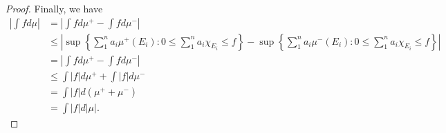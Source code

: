 \documentclass[10pt]{article}
\newcommand{\Int}{{\displaystyle \int}}
\begin{document}
\begin{enumerate}
\begin{proof}
Finally, we have
\begin{align*}
\left| \Int f d\mu \right| &=
\left|\Int f d\mu^+ - \Int f d\mu^- \right|
\\
&\leq \left| \sup\left\{ \sum_1^n a_i \mu^+(E_i) : 0 \leq \sum_1^n a_i \chi_{E_i} \leq f \right\} - \sup\left\{\sum_1^n a_i \mu^-(E_i) : 0 \leq \sum_1^n a_i \chi_{E_i} \leq f \right\} \right|
\\
&= \left| \Int f d\mu^+ - \Int f d\mu^- \right|
\\
&\leq \Int |f| d\mu^+ + \Int |f| d\mu^-
\\
&= \Int |f| d(\mu^+ + \mu^-)
\\
&= \Int |f| d|\mu|.
\end{align*}






\begin{comment}
\begin{align*}
\left| \Int f d\mu \right| &= \left| \sup\left\{ \sum_1^n a_i \mu(E_i) : 0 \leq \sum_1^n a_i \chi_{E_i} \leq f \right\} \right|
\\
&= \left| \sup\left\{ \sum_1^n a_i \mu^+(E_i) - \sum_1^n a_i \mu^-(E_i) : 0 \leq \sum_1^n a_i \chi_{E_i} \leq f \right\} \right|
\\
&\leq \left| \sup\left\{ \left|\sum_1^n a_i \mu^+(E_i)\right| + \left|\sum_1^n a_i \mu^-(E_i)\right| : 0 \leq \sum_1^n a_i \chi_{E_i} \leq f \right\} \right|
\\
&\leq \left| \sup\left\{ \left|\sum_1^n a_i \mu^+(E_i)\right| : 0 \leq \sum_1^n a_i \chi_{E_i} \leq f \right\} + \sup\left\{\left|\sum_1^n a_i \mu^-(E_i)\right| : 0 \leq \sum_1^n a_i \chi_{E_i} \leq f \right\} \right|
\\
&= \left| \Int |f| d\mu^+ + \Int |f| d\mu^- \right|
\\
&= \Int |f| d\mu^+ + \Int |f| d\mu^-
\\
&= \Int |f| d(\mu^+ + \mu^-)
\\
&= \Int |f| d|\mu|
\end{align*}
\end{comment}
\end{proof}

\end{enumerate}
\end{document}
